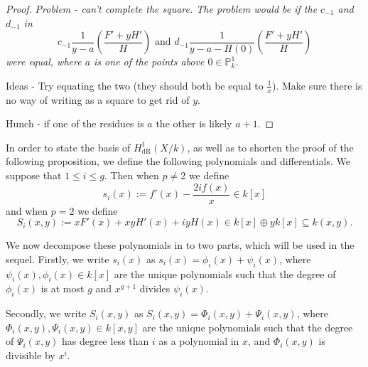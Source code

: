 \documentclass[draft, 11pt]{article} %
\theoremstyle{plain}
\theoremstyle{remark}
\newcommand{\derhamhone}{H_{\text {dR}}^1(X/k)}
\begin{document}
\begin{proof}
{\sl Problem - can't complete the square. The problem would be if the $c_{-1}$ and $d_{-1}$ in 
\[
c_{-1}\frac{1}{y-a}\left(\frac{F'+yH'}{H}\right) \text{ and } d_{-1}\frac{1}{y-a-H(0)}\left(\frac{F'+yH'}{H}\right)
\]
were equal, where $a$ is one of the points above $0\in \mathbb P_k^1$.

Ideas - Try equating the two (they should both be equal to $\frac{1}{x}$).
Make sure there is no way of writing as a square to get rid of $y$.

Hunch - if one of the residues is $a$ the other is likely $a+1$.}
\end{proof}



In order to state the basis of $\derhamhone$, as well as to shorten the proof of the following proposition, we define the following polynomials and differentials. 
We suppose that $1 \leq i \leq g$.
Then when $p\neq 2$ we define
\[
s_i(x) := f'(x) - \frac{2if(x)}{x} \in k[x]
\]
and when $p = 2$ we define
\begin{equation}\label{capitals}
S_i(x,y) := xF'(x) + xyH'(x) + iyH(x)\in k[x]\oplus yk[x] \subseteq k(x,y).
\end{equation}

We now decompose these polynomials in to two parts, which will be used in the sequel.
Firstly, we write $s_i(x)$ as $s_i(x) = \phi_i(x) + \psi_i(x)$, where $\psi_i(x), \phi_i(x) \in k[x]$ are the unique polynomials such that the degree of $\phi_i (x)$ is at most $g$ and $x^{g+1}$ divides $\psi_i(x)$.


Secondly, we write $S_i(x,y)$ as $S_i(x,y) = \Phi_i(x,y) + \Psi_i(x,y)$, where $\Phi_i(x,y), \Psi_i(x,y) \in k[x,y]$ are the unique polynomials such that the degree of $\Psi_i(x,y)$ has degree less than $i$ as a polynomial in $x$, and $\Phi_i(x,y)$ is divisible by $x^i$.
\end{document}
